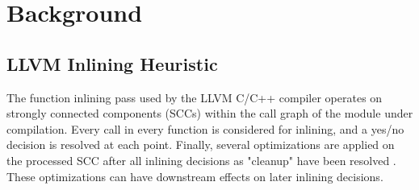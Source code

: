 \documentclass[nohyperref]{article}
\theoremstyle{plain}
\theoremstyle{definition}
\theoremstyle{remark}
\begin{document}




\section{Background}
\label{background}
\subsection{LLVM Inlining Heuristic}
The function inlining pass used by the LLVM C/C++ compiler operates on strongly connected components (SCCs) within the call graph of the module under compilation. Every call in every function is considered for inlining, and a yes/no decision is resolved at each point. Finally, several optimizations are applied on the processed SCC after all inlining decisions as "cleanup" have been resolved \cite{mlgo}. These optimizations can have downstream effects on later inlining decisions.
\end{document}

